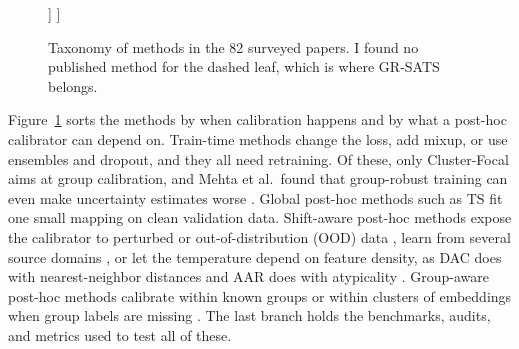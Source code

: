 \documentclass[sigconf,nonacm]{acmart}
\begin{document}
\begin{figure}[t]
\begin{forest}
      ]
    ]
  \end{forest}
  \caption{Taxonomy of methods in the 82 surveyed papers. I found no published method for the dashed leaf, which is where GR-SATS belongs.}
  \label{fig:taxonomy}
\end{figure}

Figure~\ref{fig:taxonomy} sorts the methods by when calibration happens and by what a post-hoc calibrator can depend on. Train-time methods change the loss, add mixup, or use ensembles and dropout, and they all need retraining. Of these, only Cluster-Focal \cite{shui2023clusterfocal} aims at group calibration, and Mehta et al.\ found that group-robust training can even make uncertainty estimates worse \cite{mehta2023evaluating}. Global post-hoc methods such as TS \cite{guo2017calibration} fit one small mapping on clean validation data. Shift-aware post-hoc methods expose the calibrator to perturbed or out-of-distribution (OOD) data \cite{tomani2021posthoc,roschewitz2025where}, learn from several source domains \cite{gong2021confidence,yu2022multidomain}, or let the temperature depend on feature density, as DAC does with nearest-neighbor distances and AAR does with atypicality \cite{tomani2023dac,yuksekgonul2023atypicality}. Group-aware post-hoc methods calibrate within known groups \cite{hebertjohnson2018multicalibration,shen2025calin} or within clusters of embeddings when group labels are missing \cite{salvador2022faircal,yang2023beyond}. The last branch holds the benchmarks, audits, and metrics used to test all of these.
\end{document}
